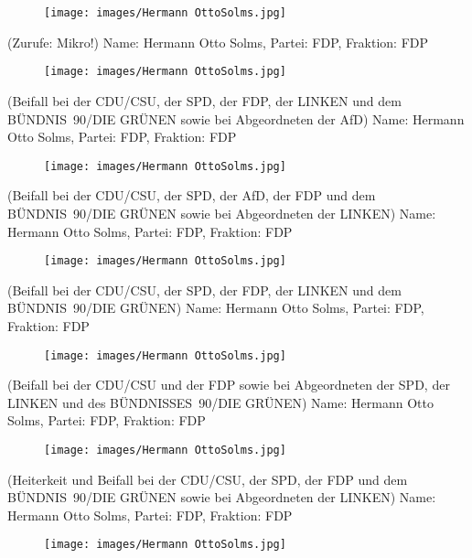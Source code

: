 \documentclass[10pt, a4paper]{report}
\begin{document}
\begin{figure}[!ht]
\texttt{[image: images/Hermann OttoSolms.jpg]}
\end{figure}


(Zurufe: Mikro!)
Name: Hermann Otto Solms, Partei: FDP, Fraktion: FDP

\begin{figure}[!ht]
\texttt{[image: images/Hermann OttoSolms.jpg]}
\end{figure}


(Beifall bei der CDU/CSU, der SPD, der FDP, der LINKEN und dem BÜNDNIS 90/DIE GRÜNEN sowie bei Abgeordneten der AfD)
Name: Hermann Otto Solms, Partei: FDP, Fraktion: FDP

\begin{figure}[!ht]
\texttt{[image: images/Hermann OttoSolms.jpg]}
\end{figure}


(Beifall bei der CDU/CSU, der SPD, der AfD, der FDP und dem BÜNDNIS 90/DIE GRÜNEN sowie bei Abgeordneten der LINKEN)
Name: Hermann Otto Solms, Partei: FDP, Fraktion: FDP

\begin{figure}[!ht]
\texttt{[image: images/Hermann OttoSolms.jpg]}
\end{figure}


(Beifall bei der CDU/CSU, der SPD, der FDP, der LINKEN und dem BÜNDNIS 90/DIE GRÜNEN)
Name: Hermann Otto Solms, Partei: FDP, Fraktion: FDP

\begin{figure}[!ht]
\texttt{[image: images/Hermann OttoSolms.jpg]}
\end{figure}


(Beifall bei der CDU/CSU und der FDP sowie bei Abgeordneten der SPD, der LINKEN und des BÜNDNISSES 90/DIE GRÜNEN)
Name: Hermann Otto Solms, Partei: FDP, Fraktion: FDP

\begin{figure}[!ht]
\texttt{[image: images/Hermann OttoSolms.jpg]}
\end{figure}


(Heiterkeit und Beifall bei der CDU/CSU, der SPD, der FDP und dem BÜNDNIS 90/DIE GRÜNEN sowie bei Abgeordneten der LINKEN)
Name: Hermann Otto Solms, Partei: FDP, Fraktion: FDP

\begin{figure}[!ht]
\texttt{[image: images/Hermann OttoSolms.jpg]}
\end{figure}
\end{document}
